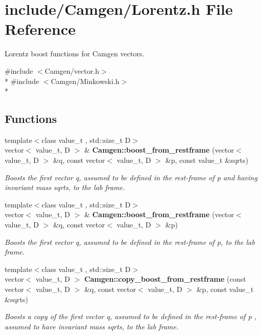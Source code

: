 \hypertarget{a00663}{\section{include/\-Camgen/\-Lorentz.h File Reference}
\label{a00663}
}


Lorentz boost functions for Camgen vectors.  


{\ttfamily \#include $<$Camgen/vector.\-h$>$}\\*
{\ttfamily \#include $<$Camgen/\-Minkowski.\-h$>$}\\*
\subsection*{Functions}
\begin{DoxyCompactItemize}
\item 
{\footnotesize template$<$class value\-\_\-t , std\-::size\-\_\-t D$>$ }\\vector$<$ value\-\_\-t, D $>$ \& {\bfseries Camgen\-::boost\-\_\-from\-\_\-restframe} (vector$<$ value\-\_\-t, D $>$ \&q, const vector$<$ value\-\_\-t, D $>$ \&p, const value\-\_\-t \&sqrts)
\begin{DoxyCompactList}\small\item\em Boosts the first vector q, assumed to be defined in the rest-\/frame of p and having invariant mass sqrts, to the lab frame. \end{DoxyCompactList}\item 
{\footnotesize template$<$class value\-\_\-t , std\-::size\-\_\-t D$>$ }\\vector$<$ value\-\_\-t, D $>$ \& {\bfseries Camgen\-::boost\-\_\-from\-\_\-restframe} (vector$<$ value\-\_\-t, D $>$ \&q, const vector$<$ value\-\_\-t, D $>$ \&p)
\begin{DoxyCompactList}\small\item\em Boosts the first vector q, assumed to be defined in the rest-\/frame of p, to the lab frame. \end{DoxyCompactList}\item 
{\footnotesize template$<$class value\-\_\-t , std\-::size\-\_\-t D$>$ }\\vector$<$ value\-\_\-t, D $>$ {\bfseries Camgen\-::copy\-\_\-boost\-\_\-from\-\_\-restframe} (const vector$<$ value\-\_\-t, D $>$ \&q, const vector$<$ value\-\_\-t, D $>$ \&p, const value\-\_\-t \&sqrts)
\begin{DoxyCompactList}\small\item\em Boosts a copy of the first vector q, assumed to be defined in the rest-\/frame of p , assumed to have invariant mass sqrts, to the lab frame. \end{DoxyCompactList}\item 

\end{DoxyCompactItemize}

